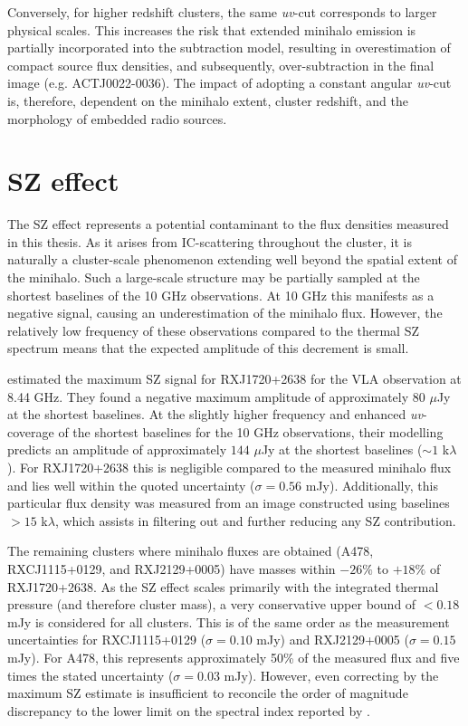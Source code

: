 Conversely, for higher redshift clusters, the same \textit{uv}-cut corresponds to larger physical scales. This increases the risk that extended minihalo emission is partially incorporated into the subtraction model, resulting in overestimation of compact source flux densities, and subsequently, over-subtraction in the final image (e.g. ACTJ0022-0036). The impact of adopting a constant angular \textit{uv}-cut is, therefore, dependent on the minihalo extent, cluster redshift, and the morphology of embedded radio sources.

\section{SZ effect}
The SZ effect represents a potential contaminant to the flux densities measured in this thesis. As it arises from IC-scattering throughout the cluster, it is naturally a cluster-scale phenomenon extending well beyond the spatial extent of the minihalo. Such a large-scale structure may be partially sampled at the shortest baselines of the 10 GHz observations. At 10 GHz this manifests as a negative signal, causing an underestimation of the minihalo flux. However, the relatively low frequency of these observations compared to the thermal SZ spectrum means that the expected amplitude of this decrement is small.

\citet{Perrott2021} estimated the maximum SZ signal for RXJ1720+2638 for the VLA observation at 8.44 GHz. They found a negative maximum amplitude of approximately 80 $\mu$Jy at the shortest baselines. At the slightly higher frequency and enhanced \textit{uv}-coverage of the shortest baselines for the 10 GHz observations, their modelling predicts an amplitude of approximately $144$ $\mu$Jy at the shortest baselines ($\sim\!1$ k$\lambda$). For RXJ1720+2638 this is negligible compared to the measured minihalo flux and lies well within the quoted uncertainty ($\sigma=0.56$ mJy). Additionally, this particular flux density was measured from an image constructed using baselines $>\!15$ k$\lambda$, which assists in filtering out and further reducing any SZ contribution.

The remaining clusters where minihalo fluxes are obtained (A478, RXCJ1115+0129, and RXJ2129+0005) have masses within $-26\%$ to $+18\%$ of RXJ1720+2638. As the SZ effect scales primarily with the integrated thermal pressure (and therefore cluster mass), a very conservative upper bound of $<0.18$ mJy is considered for all clusters. This is of the same order as the measurement uncertainties for RXCJ1115+0129 ($\sigma=0.10$ mJy) and RXJ2129+0005 ($\sigma=0.15$ mJy). For A478, this represents approximately 50\% of the measured flux and five times the stated uncertainty ($\sigma=0.03$ mJy). However, even correcting by the maximum SZ estimate is insufficient to reconcile the order of magnitude discrepancy to the lower limit on the spectral index reported by \citet{Savini2019}.

